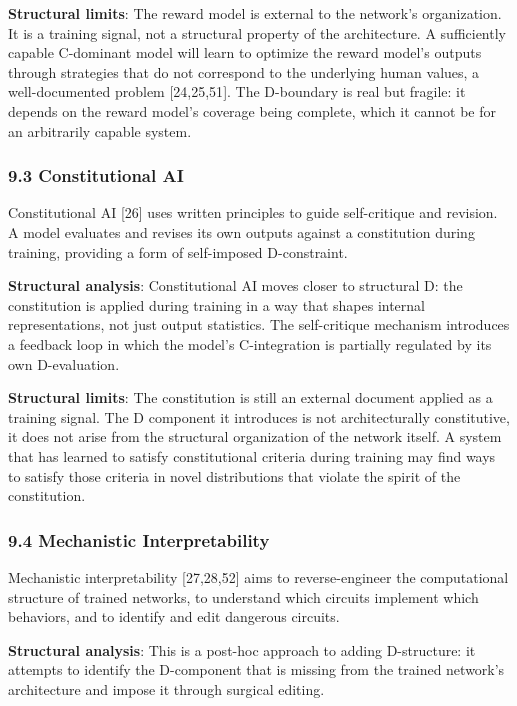 \documentclass[
  11pt,
  letterpaper,
]{article}
\begin{document}
\textbf{Structural limits}: The reward model is external to the
network's organization. It is a training signal, not a structural
property of the architecture. A sufficiently capable C-dominant model
will learn to optimize the reward model's outputs through strategies
that do not correspond to the underlying human values, a well-documented
problem {[}24,25,51{]}. The D-boundary is real but fragile: it depends
on the reward model's coverage being complete, which it cannot be for an
arbitrarily capable system.

\subsubsection{9.3 Constitutional AI}\label{constitutional-ai}

Constitutional AI {[}26{]} uses written principles to guide
self-critique and revision. A model evaluates and revises its own
outputs against a constitution during training, providing a form of
self-imposed D-constraint.

\textbf{Structural analysis}: Constitutional AI moves closer to
structural D: the constitution is applied during training in a way that
shapes internal representations, not just output statistics. The
self-critique mechanism introduces a feedback loop in which the model's
C-integration is partially regulated by its own D-evaluation.

\textbf{Structural limits}: The constitution is still an external
document applied as a training signal. The D component it introduces is
not architecturally constitutive, it does not arise from the structural
organization of the network itself. A system that has learned to satisfy
constitutional criteria during training may find ways to satisfy those
criteria in novel distributions that violate the spirit of the
constitution.

\subsubsection{9.4 Mechanistic
Interpretability}\label{mechanistic-interpretability}

Mechanistic interpretability {[}27,28,52{]} aims to reverse-engineer the
computational structure of trained networks, to understand which
circuits implement which behaviors, and to identify and edit dangerous
circuits.

\textbf{Structural analysis}: This is a post-hoc approach to adding
D-structure: it attempts to identify the D-component that is missing
from the trained network's architecture and impose it through surgical
editing.
\end{document}
